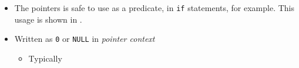 \begin{itemize}[noitemsep]
\item The  pointers is safe to use as a predicate, in \texttt{if} statements, for example.
  This usage is shown in .
\item Written as \texttt{0} or \texttt{NULL} in \emph{pointer context}
  \begin{itemize}
  \item Typically 
  \end{itemize}
\end{itemize}


